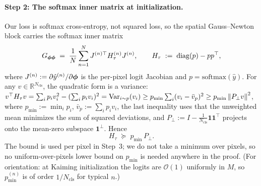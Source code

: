\paragraph{Step 2: The softmax inner matrix at initialization.}
Our loss is softmax cross-entropy, not squared loss, so the spatial
Gauss--Newton block carries the softmax inner matrix
\[
    G_{{\boldsymbol{\phi}}{\boldsymbol{\phi}}}
    \;=\; \frac{1}{N} \sum_{n=1}^{N}
        J^{(n)\top} H_\tau^{(n)} J^{(n)},
    \qquad
    H_\tau \;:=\; \mathrm{diag}(p) - p p^\top,
\]
where $J^{(n)} := \partial \hat{y}^{(n)} / \partial {\boldsymbol{\phi}}$ is the
per-pixel logit Jacobian and $p = \mathrm{softmax}(\hat{y})$. For any
$v \in \mathbb{R}^{N_{\mathrm{cls}}}$, the quadratic form is a variance:
$v^\top H_\tau v = \sum_i p_i v_i^2 - (\sum_i p_i v_i)^2 =
\mathrm{Var}_{i \sim p}(v_i) \geq p_{\min} \sum_i (v_i - \bar{v}_p)^2
\geq p_{\min} \left\lVert P_\perp v\right\rVert^2$, where
$p_{\min} := \min_i p_i$, $\bar{v}_p := \sum_i p_i v_i$, the last
inequality uses that the unweighted mean minimizes the sum of squared
deviations, and $P_\perp := I - \tfrac{1}{N_{\mathrm{cls}}}
\mathbf{1}\mathbf{1}^\top$ projects onto the mean-zero subspace
$\mathbf{1}^\perp$. Hence
\[
    H_\tau \;\succeq\; p_{\min} \, P_\perp .
\]
The bound is used per pixel in Step~3; we do not take a minimum over
pixels, so no uniform-over-pixels lower bound on $p_{\min}$ is
needed anywhere in the proof. (For orientation: at Kaiming
initialization the logits are $\mathcal{O}(1)$ uniformly in $M$, so
$p^{(n)}_{\min}$ is of order $1/N_{\mathrm{cls}}$ for typical $n$.)

